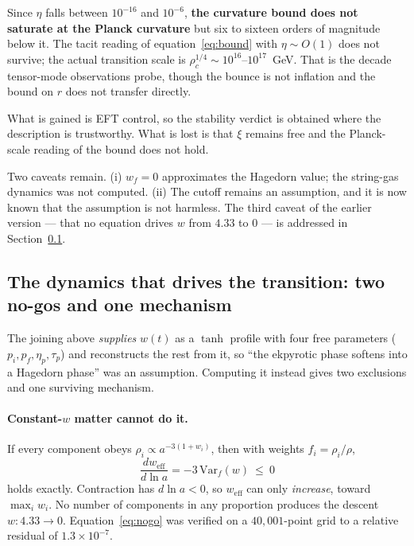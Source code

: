 \documentclass[a4paper,11pt]{article}
\begin{document}
Since $\eta$ falls between $10^{-16}$ and $10^{-6}$, \textbf{the curvature bound does not saturate at the Planck curvature} but six to sixteen orders of magnitude below it. The tacit reading of equation~\eqref{eq:bound} with $\eta\sim O(1)$ does not survive; the actual transition scale is $\rho_c^{1/4}\sim10^{16}$--$10^{17}$~GeV. That is the decade tensor-mode observations probe, though the bounce is not inflation and the bound on $r$ does not transfer directly.

What is gained is EFT control, so the stability verdict is obtained where the description is trustworthy. What is lost is that $\xi$ remains free and the Planck-scale reading of the bound does not hold.

Two caveats remain. (i) $w_f=0$ approximates the Hagedorn value; the string-gas dynamics was not computed. (ii) The cutoff remains an assumption, and it is now known that the assumption is not harmless. The third caveat of the earlier version --- that no equation drives $w$ from $4.33$ to $0$ --- is addressed in Section~\ref{sec:eos}.

\subsection{The dynamics that drives the transition: two no-gos and one mechanism}
\label{sec:eos}

The joining above \emph{supplies} $w(t)$ as a $\tanh$ profile with four free parameters ($p_i,p_f,\eta_p,\tau_p$) and reconstructs the rest from it, so ``the ekpyrotic phase softens into a Hagedorn phase'' was an assumption. Computing it instead gives two exclusions and one surviving mechanism.

\paragraph{Constant-$w$ matter cannot do it.} If every component obeys $\rho_i\propto a^{-3(1+w_i)}$, then with weights $f_i=\rho_i/\rho$,
\begin{equation}
\frac{d w_{\mathrm{eff}}}{d\ln a}=-3\,\mathrm{Var}_f(w)\ \le\ 0
\label{eq:nogo}
\end{equation}
holds exactly. Contraction has $d\ln a<0$, so $w_{\mathrm{eff}}$ can only \emph{increase}, toward $\max_i w_i$. No number of components in any proportion produces the descent $w:4.33\to0$. Equation~\eqref{eq:nogo} was verified on a $40{,}001$-point grid to a relative residual of $1.3\times10^{-7}$.
\end{document}
